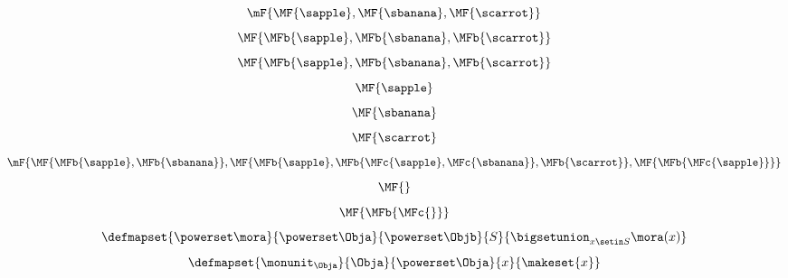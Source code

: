{\begin{forslides}
\begin{equation}
        \label{eq:fruit-sum-13}
        \mF{\MF{\sapple}   ,  \MF{\sbanana}  ,  \MF{\scarrot}}
    \end{equation}
    \begin{equation}
        \label{eq:fruit-sum-14}
        \MF{\MFb{\sapple}   ,  \MFb{\sbanana}  ,  \MFb{\scarrot}}
    \end{equation}
    \begin{equation}
        \label{eq:fruit-sum-15}
        \MF{\MFb{\sapple}  ,  \MFb{\sbanana}  ,  \MFb{\scarrot}}
    \end{equation}
    \begin{equation}
        \label{eq:fruit-sum-16}
        \MF{\sapple}
    \end{equation}
    \begin{equation}
        \label{eq:fruit-sum-17}
        \MF{\sbanana}
    \end{equation}
    \begin{equation}
        \label{eq:fruit-sum-18}
        \MF{\scarrot}
    \end{equation}
    \begin{equation}
        \label{eq:fruit-sum-20}
        \mF{
            \MF{\MFb{\sapple}  , \MFb{\sbanana}},
            \MF{\MFb{\sapple}   , \MFb{\MFc{\sapple}, \MFc{\sbanana}} ,  \MFb{\scarrot}},
            \MF{\MFb{\MFc{\sapple}}}
        }
    \end{equation}
    \begin{equation}
        \label{eq:fruit-sum-21-empty}
        \MF{}
    \end{equation}
    \begin{equation}
        \label{eq:fruit-sum-22-empty}
        \MF{\MFb{\MFc{}}}
    \end{equation}
    \begin{equation}
        \label{eq:monad-power-functor}
        \defmapset{
            \powerset \mora
        }{
            \powerset \Obja
        }{
            \powerset \Objb
        }{
            S
        }{
            \bigsetunion_{x\setin S} \mora(x)
        }
    \end{equation}
    \begin{equation}
        \label{eq:monad-power-monunit}
        \defmapset{
            \monunit_\Obja
        }{
            \Obja
        }{
            \powerset\Obja
        }{
            x
        }{
            \makeset{ x }
        }
    \end{equation}


\end{forslides}}
